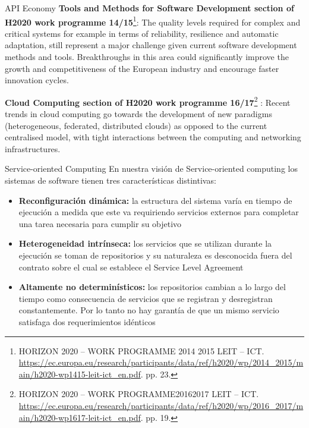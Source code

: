 \documentclass[10pt,xcolor={table,dvipsnames},t]{beamer}
\begin{document}
\begin{frame}{API Economy}
 \vspace{\fill}
 \textbf{Tools and Methods for Software Development section of H2020 work programme 14/15}\footnote{HORIZON 2020 – WORK PROGRAMME 2014 2015 LEIT – ICT. \url{https://ec.europa.eu/research/participants/data/ref/h2020/wp/2014_2015/main/h2020-wp1415-leit-ict_en.pdf}. pp. 23.}: 
 The quality levels required for complex and critical systems for example in terms of reliability, resilience and automatic adaptation, still represent a major challenge given current software development methods and tools. Breakthroughs in this area could significantly improve the growth and competitiveness of the European industry and encourage faster innovation cycles.
 
\vspace{\fill}
\textbf{Cloud Computing section of H2020 work programme 16/17}\footnote{HORIZON 2020 – WORK PROGRAMME20162017 LEIT – ICT. \url{https://ec.europa.eu/research/participants/data/ref/h2020/wp/2016_2017/main/h2020-wp1617-leit-ict_en.pdf}. pp. 19.} : Recent trends in cloud computing go towards the development of new paradigms (heterogeneous, federated, distributed clouds) as opposed to the current centralised model, with tight interactions between the computing and networking infrastructures.
\vspace{\fill}
\end{frame}

\begin{frame}{Service-oriented Computing}
 \vspace{\fill}
En nuestra visión de Service-oriented computing los sistemas de software tienen tres características distintivas:
\begin{itemize}
  \item \textbf{Reconfiguración dinámica:} la estructura del sistema varía en tiempo de ejecución a medida que este va requiriendo servicios externos para completar una tarea necesaria para cumplir su objetivo

  \item \textbf{Heterogeneidad intrínseca:} los servicios que se utilizan durante la ejecución se toman de repositorios y su naturaleza es desconocida fuera del contrato sobre el cual se establece el Service Level Agreement
  
  \item \textbf{Altamente no determinísticos:} los repositorios cambian a lo largo del tiempo como consecuencia de servicios que se registran y desregistran constantemente. Por lo tanto no hay garantía de que un mismo servicio satisfaga dos requerimientos idénticos 

\end{itemize}
 \vspace{\fill}

\end{frame}
\end{document}
